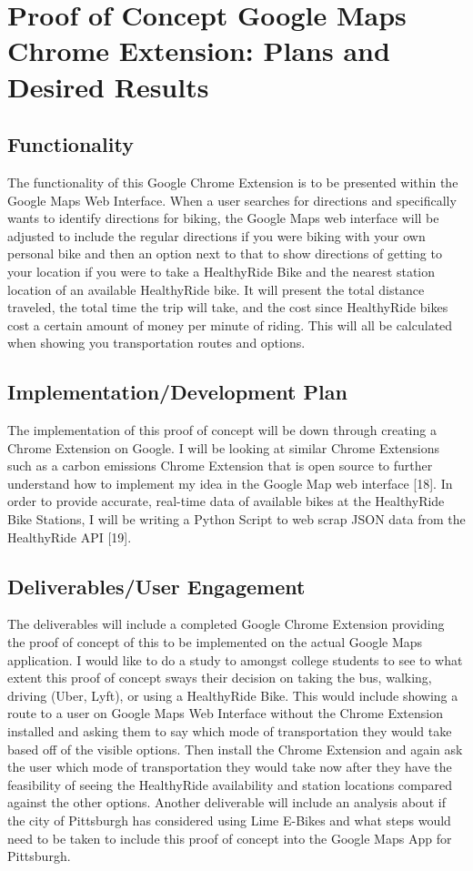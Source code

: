 \documentclass[letterpaper, 12 pt, conference]{ieeeconf}  %
\begin{document}
\section{Proof of Concept Google Maps Chrome Extension: Plans and Desired Results}
\subsection{Functionality}
The functionality of this Google Chrome Extension is to be presented within the Google Maps Web Interface. When a user searches for directions and specifically wants to identify directions for biking, the Google Maps web interface will be adjusted to include the regular directions if you were biking with your own personal bike and then an option next to that to show directions of getting to your location if you were to take a HealthyRide Bike and the nearest station location of an available HealthyRide bike. It will present the total distance traveled, the total time the trip will take, and the cost since HealthyRide bikes cost a certain amount of money per minute of riding. This will all be calculated when showing you transportation routes and options. 

\subsection{Implementation/Development Plan}
The implementation of this proof of concept will be down through creating a Chrome Extension on Google. I will be looking at similar Chrome Extensions such as a carbon emissions Chrome Extension that is open source to further understand how to implement my idea in the Google Map web interface [18]. In order to provide accurate, real-time data of available bikes at the HealthyRide Bike Stations, I will be writing a Python Script to web scrap JSON data from the HealthyRide API [19].
\newline


\subsection{Deliverables/User Engagement}
The deliverables will include a completed Google Chrome Extension providing the proof of concept of this to be implemented on the actual Google Maps application. I would like to do a study to amongst college students to see to what extent this proof of concept sways their decision on taking the bus, walking, driving (Uber, Lyft), or using a HealthyRide Bike. This would include showing a route to a user on Google Maps Web Interface without the Chrome Extension installed and asking them to say which mode of transportation they would take based off of the visible options. Then install the Chrome Extension and again ask the user which mode of transportation they would take now after they have the feasibility of seeing the HealthyRide availability and station locations compared against the other options. Another deliverable will include an analysis about if the city of Pittsburgh has considered using Lime E-Bikes and what steps would need to be taken to include this proof of concept into the Google Maps App for Pittsburgh. 
\end{document}
